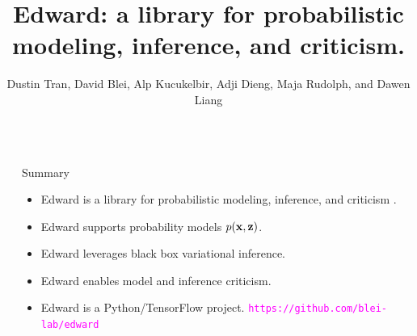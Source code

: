 \documentclass{beamer}
\title{Edward: a library for probabilistic modeling, inference, and criticism.}
\author{
Dustin Tran, David Blei, Alp Kucukelbir, Adji Dieng, Maja Rudolph, and Dawen Liang
}
\institute{
Columbia University
}
\begin{document}
\begin{frame}[t] 
\begin{columns}[t,totalwidth=10in]  %

\begin{column}{\sepwid}\end{column} %

\begin{column}{\onecolwid} 

\begin{alertblock}{Summary}
\begin{itemize}
  \item Edward is a library for probabilistic modeling, inference, and
  criticism \citep{tran2016edward}.
  \item Edward supports probability models $p(\boldsymbol{\mathbf{x}},\boldsymbol{\mathbf{z}})$.
  \item Edward leverages black box variational inference.
  \item Edward enables model and inference criticism.
  \item Edward is a Python/TensorFlow project.\newline\newline
  \textcolor{Fuchsia}{\texttt{https://github.com/blei-lab/edward}}\newline
\end{itemize}
\end{alertblock}


\end{column}
\end{columns}
\end{frame}
\end{document}
